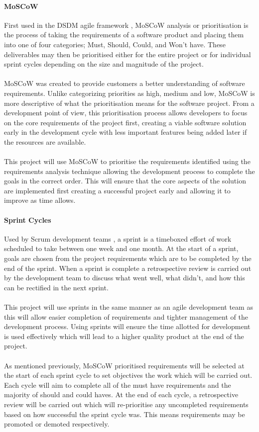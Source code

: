 		\paragraph{MoSCoW}
			First used in the DSDM agile framework , MoSCoW analysis or prioritisation is the process of taking the requirements of a software product and placing them into one of four categories; Must, Should, Could, and Won’t have. These deliverables may then be prioritised either for the entire project or for individual sprint cycles depending on the size and magnitude  of the project.
			\\\\
			MoSCoW was created to provide customers a better understanding of software requirements. Unlike  categorizing priorities as high, medium and low,  MoSCoW is more descriptive of what the prioritisation means for the software project. From a development point of view, this prioritisation process allows developers to focus on the core requirements of the project first, creating a viable software solution early in the development cycle with less important features being added later if the resources are available.
			\\\\
			This project  will use MoSCoW to prioritise the requirements identified using the requirements analysis technique allowing the development process to complete the goals in the correct order. This will ensure that the core aspects of the solution are implemented first creating a successful project early and allowing it to improve as time allows.
		\paragraph{Sprint Cycles}
			Used by Scrum development teams , a sprint is a timeboxed effort of work scheduled to take between one week and one month. At the start of a sprint, goals are chosen from the project requirements which are to be completed by the end of the sprint. When a sprint is complete a retrospective review is carried out by the development team to discuss what went well, what didn’t, and how this can be rectified in  the next sprint.
			\\\\
			This project will use sprints in the same manner as an agile development team as this will allow easier completion of requirements and tighter management of the development process. Using sprints will ensure the time allotted for development is used effectively which will lead to a higher quality product at the end of the project. 
			\\\\
			As mentioned previously, MoSCoW prioritised requirements will be selected at the start of each sprint cycle to set objectives the work which will be carried out. Each cycle will aim to complete all of the must have requirements and the majority of should and could haves. At the end of each cycle, a retrospective review will be carried out which will re-prioritise any  uncompleted requirements based on how successful the sprint cycle was. This means requirements may be promoted or demoted respectively.

